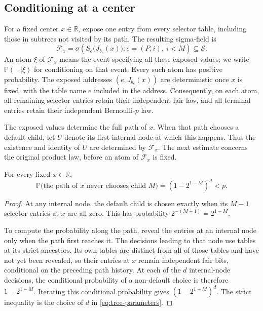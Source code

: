 \subsection{Conditioning at a center}

For a fixed center \(x\in\mathbb R\), expose one entry from every
selector table, including those in subtrees not visited by its path.
The resulting sigma-field is
\begin{equation}
 \label{eq:center-exposure}
 \mathcal F_x
 =
 \sigma\left(
 S_e\bigl(J_{b_e}(x)\bigr):
 e=(P,i),\ i<M
 \right)
 \subseteq\mathcal S.
\end{equation}
An atom \(\xi\) of \(\mathcal F_x\) means the event specifying all
these exposed values; we write \(\mathbb P(\,\cdot\mid\xi)\) for
conditioning on that event.
Every such atom has positive probability.
The exposed addresses \((e,J_{b_e}(x))\) are deterministic once
\(x\) is fixed, with the table name \(e\) included in the address.
Consequently, on each atom, all remaining selector entries retain
their independent fair law, and all terminal entries retain their
independent Bernoulli-\(p\) law.

The exposed values determine the full path of \(x\).
When that path chooses a default child, let \(U\) denote its first
internal node at which this happens.  Thus the existence and identity
of \(U\) are determined by \(\mathcal F_x\).
The next estimate concerns the original product law, before an atom
of \(\mathcal F_x\) is fixed.

\begin{lemma}
 \label{lem:first-default}
For every fixed \(x\in\mathbb R\),
\[
 \mathbb P\bigl(\text{the path of \(x\) never chooses child \(M\)}\bigr)
 =
 (1-2^{1-M})^d<p.
\]
\end{lemma}

\begin{proof}
At any internal node, the default child is chosen exactly when its
\(M-1\) selector entries at \(x\) are all zero.  This has probability
\(2^{-(M-1)}=2^{1-M}\).

To compute the probability along the path, reveal the entries at an
internal node only when the path first reaches it.  The decisions
leading to that node use tables at its strict ancestors.  Its own
tables are distinct from all of those tables and have not yet been
revealed, so their entries at \(x\) remain independent fair bits,
conditional on the preceding path history.
At each of the \(d\) internal-node decisions, the conditional
probability of a non-default choice is therefore \(1-2^{1-M}\).
Iterating this conditional probability gives
\((1-2^{1-M})^d\).  The strict inequality is the choice of \(d\) in
\eqref{eq:tree-parameters}.
\end{proof}

